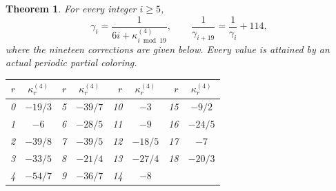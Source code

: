 \documentclass[11pt,reqno]{amsart}
\theoremstyle{plain}
\newtheorem{theorem}{Theorem}
\theoremstyle{plain}
\theoremstyle{plain}
\begin{document}
\begin{theorem}\label{M-thm:all-high}
For every integer $i\ge5$,
\[
 \gamma_i=\frac{1}{6i+\kappa^{(4)}_{i\bmod19}},\qquad
 \frac1{\gamma_{i+19}}=\frac1{\gamma_i}+114,
\]
where the nineteen corrections are given below. Every value is attained
by an actual periodic partial coloring.
\begin{center}\small
\begin{tabular}{rcrcrcrc}
\toprule
$r$&$\kappa^{(4)}_r$&$r$&$\kappa^{(4)}_r$&$r$&$\kappa^{(4)}_r$&$r$&$\kappa^{(4)}_r$\\\midrule
0&$-19/3$&5&$-39/7$&10&$-3$&15&$-9/2$\\
1&$-6$&6&$-28/5$&11&$-9$&16&$-24/5$\\
2&$-39/8$&7&$-39/5$&12&$-18/5$&17&$-7$\\
3&$-33/5$&8&$-21/4$&13&$-27/4$&18&$-20/3$\\
4&$-54/7$&9&$-36/7$&14&$-8$&&\\\bottomrule
\end{tabular}
\end{center}
\end{theorem}
\end{document}

